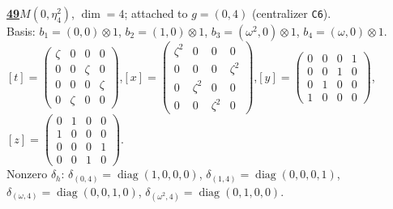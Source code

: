 \begin{samepage}\noindent\textbf{\underline{49}}\quad $M(0,\eta^{2}_{4})$, $\dim=4$; attached to $g=(0,4)$ (centralizer \texttt{C6}).\\
Basis: $b_{1}=(0,0)\otimes 1$, $b_{2}=(1,0)\otimes 1$, $b_{3}=(\omega^2,0)\otimes 1$, $b_{4}=(\omega,0)\otimes 1$.\\
$[t]=\left(\begin{smallmatrix} \zeta & 0 & 0 & 0 \\ 0 & 0 & \zeta & 0 \\ 0 & 0 & 0 & \zeta \\ 0 & \zeta & 0 & 0 \end{smallmatrix}\right)$,\quad $[x]=\left(\begin{smallmatrix} \zeta^2 & 0 & 0 & 0 \\ 0 & 0 & 0 & \zeta^2 \\ 0 & \zeta^2 & 0 & 0 \\ 0 & 0 & \zeta^2 & 0 \end{smallmatrix}\right)$,\quad $[y]=\left(\begin{smallmatrix} 0 & 0 & 0 & 1 \\ 0 & 0 & 1 & 0 \\ 0 & 1 & 0 & 0 \\ 1 & 0 & 0 & 0 \end{smallmatrix}\right)$,\quad $[z]=\left(\begin{smallmatrix} 0 & 1 & 0 & 0 \\ 1 & 0 & 0 & 0 \\ 0 & 0 & 0 & 1 \\ 0 & 0 & 1 & 0 \end{smallmatrix}\right)$.\\
Nonzero $\delta_h$: $\delta_{(0,4)}=\operatorname{diag}(1,0,0,0)$, $\delta_{(1,4)}=\operatorname{diag}(0,0,0,1)$, $\delta_{(\omega,4)}=\operatorname{diag}(0,0,1,0)$, $\delta_{(\omega^2,4)}=\operatorname{diag}(0,1,0,0)$.\end{samepage}
\medskip

